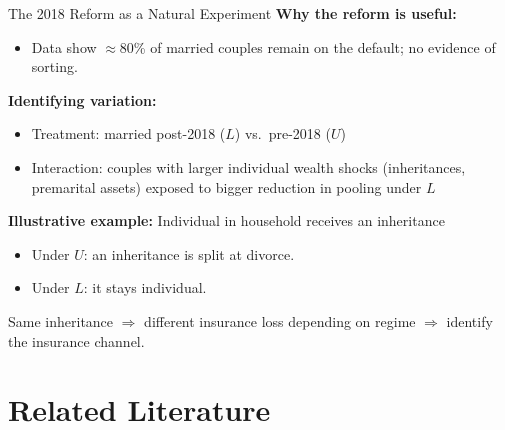 \documentclass[aspectratio=169, 11pt]{beamer}
\begin{document}
\begin{frame}{The 2018 Reform as a Natural Experiment}
\textbf{Why the reform is useful:}
\begin{itemize}
  \item Data show $\approx$80\% of married couples remain on the default; no evidence of sorting. 
\end{itemize}
\vspace{0.8em}
\textbf{Identifying variation:}
\begin{itemize}
  \item Treatment: married post-2018 ($L$) vs.\ pre-2018 ($U$)
  \item Interaction: couples with larger individual wealth shocks (inheritances, premarital assets) exposed to bigger reduction in pooling under $L$
\end{itemize}
\vspace{0.8em}
\textbf{Illustrative example:} Individual in household receives an inheritance \\
\begin{itemize}
  \item[$\rightarrow$]Under $U$: an inheritance is split at divorce.\\
  \item[$\rightarrow$]Under $L$: it stays individual.\\
\end{itemize}
Same inheritance $\Rightarrow$ different insurance loss depending on regime $\Rightarrow$ identify the insurance channel.
\end{frame}

\section{Related Literature}
\end{document}
